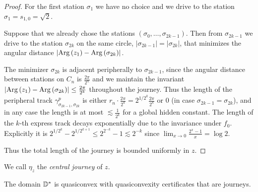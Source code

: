 \begin{proof}
For the first station $\sigma_{1}$ we have no choice and we drive
to the station $\sigma_{1}=s_{1,0}=\sqrt{2}$.

Suppose that we already chose the stations $\left(\sigma_{0},\ldots,\sigma_{2k-1}\right)$.
Then from $\sigma_{2k-1}$ we drive to the station $\sigma_{2k}$
on the same circle, $\left|\sigma_{2k-1}\right|=\left|\sigma_{2k}\right|$,
that minimizes the angular distance $\left|\mathrm{Arg}\left(z_{1}\right)-\mathrm{Arg}\left(\sigma_{2k}\right)\right|$. 

The minimizer $\sigma_{2k}$ is adjacent peripherally to $\sigma_{2k-1}$,
since the angular distance between stations on $C_{n}$ is $\frac{2\pi}{2^{n}}$
and we maintain the invariant $\left|\mathrm{Arg}\left(z_{1}\right)-\mathrm{Arg}\left(\sigma_{2k}\right)\right|\leq\frac{2\pi}{2^{k}}$
throughout the journey. Thus the length of the peripheral track $\gamma_{\sigma_{2k-1},\sigma_{2k}}^{p}$
is either $r_{n}\cdot\frac{2\pi}{2^{k}}=2^{1/2^{k}}\frac{2\pi}{2^{k}}$
or $0$ (in case $\sigma_{2k-1}=\sigma_{2k}$), and in any case the
length is at most $\lesssim\frac{1}{2^{k}}$ for a global hidden constant.
The length of the $k$-th express track decays exponentially due to
the invariance under $f_{0}$. Explicitly it is $2^{1/2^{k}}-2^{1/2^{k+1}}\leq2^{2^{-k}}-1\lesssim2^{-k}$
since $\lim_{x\to0}\frac{2^{x}-1}{x}=\log2$.

Thus the total length of the journey is  bounded uniformly in $z$.
\begin{comment}
property $4$ is automatic from property $3$, and the rest are evident
from the construction.
\end{comment}
\end{proof}
%
\begin{comment}
\begin{lemma}
In particular, the length of a suffix $\sigma_{k}+\sigma_{k+1}+\ldots$
decays exponentially in $k$, uniformly in $z$.
\end{lemma}
\end{comment}

We call $\eta_{z}$ the \emph{central journey} of $z$.
\begin{theorem}
The domain $\mathbb{D}^{*}$ is quasiconvex with quasiconvexity certificates
that are journeys.
\end{theorem}

